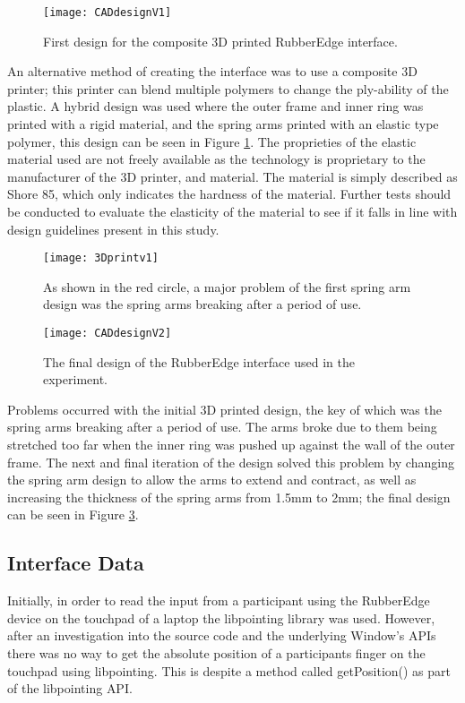 \begin{figure}[h]
    \centering
    \texttt{[image: CADdesignV1]}
    \caption{First design for the composite 3D printed RubberEdge interface.}
    \label{fig:cadv1}
\end{figure}

An alternative method of creating the interface was to use a composite 3D printer; this printer can blend multiple polymers to change the ply-ability of the plastic. A hybrid design was used where the outer frame and inner ring was printed with a rigid material, and the spring arms printed with an elastic type polymer, this design can be seen in Figure \ref{fig:cadv1}. The proprieties of the elastic material used are not freely available as the technology is proprietary to the manufacturer of the 3D printer, and material. The material is simply described as Shore 85, which only indicates the hardness of the material. Further tests should be conducted to evaluate the elasticity of the material to see if it falls in line with design guidelines present in this study\cite{Casiez2008TheDevice}.

\begin{figure}[h]
    \centering
    \texttt{[image: 3Dprintv1]}
    \caption{As shown in the red circle, a major problem of the first spring arm design was the spring arms breaking after a period of use.}
    \label{fig:3dprintv1}
\end{figure}

\begin{figure}[h]
    \centering
    \texttt{[image: CADdesignV2]}
    \caption{The final design of the RubberEdge interface used in the experiment.}
    \label{fig:cadv2}
\end{figure}

Problems occurred with the initial 3D printed design, the key of which was the spring arms breaking after a period of use. The arms broke due to them being stretched too far when the inner ring was pushed up against the wall of the outer frame. The next and final iteration of the design solved this problem by changing the spring arm design to allow the arms to extend and contract, as well as increasing the thickness of the spring arms from 1.5mm to 2mm; the final design can be seen in Figure \ref{fig:cadv2}.



\subsection{Interface Data}\label{section:interface_data}
Initially, in order to read the input from a participant using the RubberEdge device on the touchpad of a laptop the libpointing library\cite{Roussel2017Libpointing}\cite{Casiez2011NoFunctions} was used. However, after an investigation into the source code and the underlying Window's \glspl{API}\cite{RawWindows} there was no way to get the absolute position of a participants finger on the touchpad using libpointing. This is despite a method called getPosition() as part of the libpointing \gls{API}.


